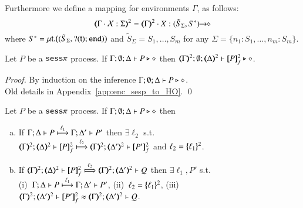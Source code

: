 \begin{remark}\rm
	Furthermore we define a mapping for environments $\Gamma$, as follows:
	\[
		\tmap{\Gamma \cat \rvar{X}:\Sigma}{2} = \tmap{\Gamma}{2} \cat X:\shot{(\tilde{S}_{\Sigma}, S^*)}
	\]
	where
	$S^* = \trec{t}{\big((\tilde{S}_{\Sigma}, \btinp{\vart{t}}\tinact)\big)}$
	and
	$\tilde{S}_{\Sigma} = S_1, \ldots, S_m$ for any $\Sigma = \{n_1:S_1, \ldots, n_m:S_m\}$.
\end{remark}



\begin{proposition}
Let $P$ be a  $\sessp$ process.
If			$\Gamma; \emptyset; \Delta \proves P \hastype \Proc$ then 
			$\mapt{\Gamma}^{2}; \emptyset; \mapt{\Delta}^{2} \proves \map{P}_f^{2} \hastype \Proc$. 
\end{proposition}

\begin{proof}
By induction on the inference $\Gamma; \emptyset; \Delta \proves P \hastype \Proc$. \\
Old details in Appendix~\ref{app:enc_sesp_to_HO}.
	\qed
\end{proof}


\begin{proposition}
Let $P$ be a  $\sessp$ process.
If $\Gamma; \emptyset; \Delta \proves P \hastype \Proc$ then
		\begin{enumerate}[a)]
			\item	 
			   If  $\stytra{\Gamma}{\ell_1}{\Delta}{P}{\Delta'}{P'}$
			   then  $\exists \ell_2$ s.t. \\
			    $\wtytra{\mapt{\Gamma}^{2}}{\ell_2}{\mapt{\Delta}^{2}}{\map{P}_f^{2}}{\mapt{\Delta'}^{2}}{\map{P'}_f^{2}}$
			    and $\ell_2 = \mapa{\ell_1}^{2}$.
			\item   
			If  $\wtytra{\mapt{\Gamma}^{2}}{\ell_2}{\mapt{\Delta}^{2}}{\map{P}^{2}_f}{\mapt{\Delta'}^{2}}{Q}$
			   then $\exists \ell_1, P'$ s.t.  \\
			    (i)~$\stytra{\Gamma}{\ell_1}{\Delta}{P}{\Delta'}{P'}$,
			    (ii)~$\ell_2 = \mapa{\ell_1}^{2}$, 
			    (iii)~$\wbb{\mapt{\Gamma}^{2}}{\ell}{\mapt{\Delta'}^{2}}{\map{P'}_f^{2}}{\mapt{\Delta'}^{2}}{Q}$.
			    \end{enumerate}
\end{proposition}

